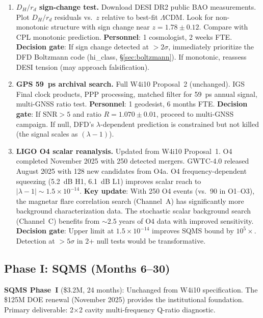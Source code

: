\documentclass[11pt]{article}
\newcommand{\ee}[1]{\times 10^{#1}}
\newcommand{\lbone}{|\lambda - 1|}
\newcommand{\SNR}{\mathrm{SNR}}
\newcommand{\LCDM}{\Lambda\text{CDM}}
\begin{document}
\begin{enumerate}[label=\textbf{0\alph*:}]
\item \textbf{$D_H/r_d$ sign-change test.} Download DESI DR2 public BAO
  measurements. Plot $D_H/r_d$ residuals vs.\ $z$ relative to best-fit
  $\LCDM$. Look for non-monotonic structure with sign change near
  $z = 1.78 \pm 0.12$. Compare with CPL monotonic prediction.
  \textbf{Personnel}: 1 cosmologist, 2 weeks FTE.
  \textbf{Decision gate}: If sign change detected at $>2\sigma$,
  immediately prioritize the DFD Boltzmann code (hi\_class, \S\ref{sec:boltzmann}).
  If monotonic, reassess DESI tension (may approach falsification).

\item \textbf{GPS 59~ps archival search.} Full W4i10 Proposal~2
  (unchanged). IGS Final clock products, PPP processing, matched
  filter for 59~ps annual signal, multi-GNSS ratio test.
  \textbf{Personnel}: 1 geodesist, 6 months FTE.
  \textbf{Decision gate}: If $\SNR > 5$ and ratio $R = 1.070 \pm 0.01$,
  proceed to multi-GNSS campaign. If null, DFD's $\lambda$-dependent
  prediction is constrained but not killed (the signal scales as
  $(\lambda-1)$).

\item \textbf{LIGO O4 scalar reanalysis.} Updated from W4i10 Proposal~1.
  O4 completed November 2025 with 250 detected mergers. GWTC-4.0
  released August 2025 with 128 new candidates from O4a.
  O4 frequency-dependent squeezing (5.2~dB H1, 6.1~dB L1) improves
  scalar reach to $\lbone \sim 1.5\ee{-14}$.
  \textbf{Key update}: With 250 O4 events (vs.\ 90 in O1--O3), the
  magnetar flare correlation search (Channel~A) has significantly more
  background characterization data. The stochastic scalar background
  search (Channel~C) benefits from $\sim 2.5$ years of O4 data with
  improved sensitivity.
  \textbf{Decision gate}: Upper limit at $1.5\ee{-14}$ improves SQMS
  bound by $10^5\times$. Detection at $>5\sigma$ in 2+ null tests
  would be transformative.
\end{enumerate}

\subsection{Phase I: SQMS (Months 6--30)}

\textbf{SQMS Phase~I} (\$3.2M, 24 months): Unchanged from W4i10
specification. The \$125M DOE renewal (November 2025) provides the
institutional foundation. Primary deliverable: 2$\times$2 cavity
multi-frequency Q-ratio diagnostic.
\end{document}
